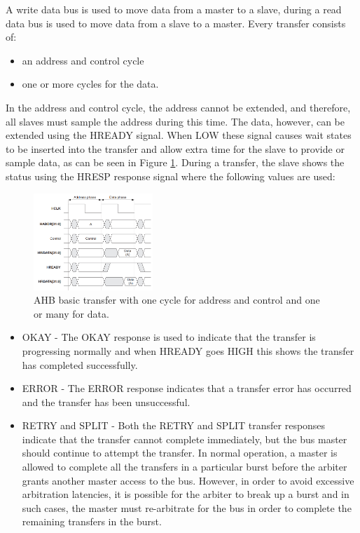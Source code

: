 A write data bus is used to move data from a master to a slave, during a read data bus
is used to move data from a slave to a master.
Every transfer consists of:

\begin{itemize}
\item an address and control cycle
\item one or more cycles for the data.
\end{itemize}



In the address and control cycle, the address cannot be extended, and therefore, all slaves must sample the address during this time. The data, however, can be extended using the HREADY signal. When LOW these signal causes wait states to be inserted into the transfer and allow extra time for the slave to provide or sample data, as can be seen in Figure \ref{fig:basic_ahb_transfer}. During a transfer, the slave shows the status using the HRESP response signal where the  following values are used:
\begin{figure}[!ht]
    \centering
    \includegraphics[width=0.4\textwidth]{figures/others/simple_ahb_transfer.png}
    \caption{AHB basic transfer with one cycle for address and control and one or many for data.}
    \label{fig:basic_ahb_transfer}
\end{figure}

\begin{itemize}

\item  {OKAY -} The OKAY response is used to indicate that the transfer is progressing normally and when HREADY goes HIGH this shows the transfer has completed successfully.
\item {ERROR -} The ERROR response indicates that a transfer error has occurred and the transfer has been unsuccessful.
\item {RETRY and SPLIT  -} Both the RETRY and SPLIT transfer responses indicate that the transfer cannot complete immediately, but the bus master should continue to attempt the transfer. In normal operation, a master is allowed to complete all the transfers in a particular burst before the arbiter grants another master access to the bus. However, in order to avoid excessive arbitration latencies, it is possible for the arbiter to break up a burst and in such cases, the master must re-arbitrate for the bus in order to complete the remaining transfers in the burst.
\end{itemize}


